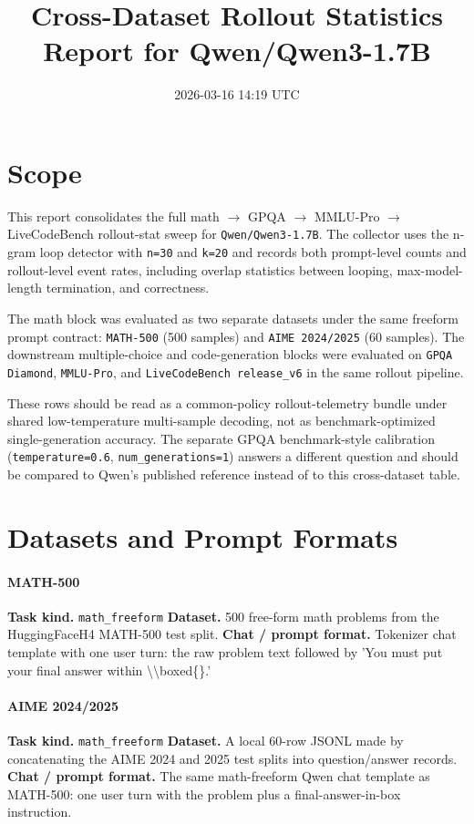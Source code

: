 \documentclass[11pt]{article}
\title{Cross-Dataset Rollout Statistics Report for Qwen/Qwen3-1.7B}
\author{}
\date{2026-03-16 14:19 UTC}
\begin{document}
\maketitle

\section*{Scope}
This report consolidates the full math $\rightarrow$ GPQA $\rightarrow$ MMLU-Pro $\rightarrow$ LiveCodeBench rollout-stat sweep for \texttt{Qwen/Qwen3-1.7B}. The collector uses the n-gram loop detector with \texttt{n=30} and \texttt{k=20} and records both prompt-level counts and rollout-level event rates, including overlap statistics between looping, max-model-length termination, and correctness.

The math block was evaluated as two separate datasets under the same freeform prompt contract: \texttt{MATH-500} (500 samples) and \texttt{AIME 2024/2025} (60 samples). The downstream multiple-choice and code-generation blocks were evaluated on \texttt{GPQA Diamond}, \texttt{MMLU-Pro}, and \texttt{LiveCodeBench release\_v6} in the same rollout pipeline.

These rows should be read as a common-policy rollout-telemetry bundle under shared low-temperature multi-sample decoding, not as benchmark-optimized single-generation accuracy. The separate GPQA benchmark-style calibration (\texttt{temperature=0.6}, \texttt{num\_generations=1}) answers a different question and should be compared to Qwen's published reference instead of to this cross-dataset table.

\section*{Datasets and Prompt Formats}
\paragraph{MATH-500}
\textbf{Task kind.} \texttt{math\_freeform}
\textbf{Dataset.} 500 free-form math problems from the HuggingFaceH4 MATH-500 test split.
\textbf{Chat / prompt format.} Tokenizer chat template with one user turn: the raw problem text followed by 'You must put your final answer within \textbackslash{}\textbackslash{}boxed\{\}.'

\paragraph{AIME 2024/2025}
\textbf{Task kind.} \texttt{math\_freeform}
\textbf{Dataset.} A local 60-row JSONL made by concatenating the AIME 2024 and 2025 test splits into question/answer records.
\textbf{Chat / prompt format.} The same math-freeform Qwen chat template as MATH-500: one user turn with the problem plus a final-answer-in-box instruction.
\end{document}
